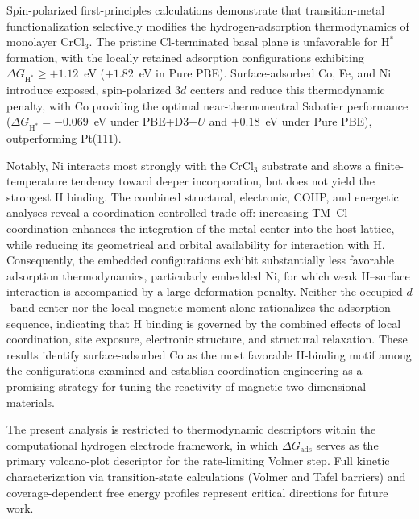 \documentclass[journal=jacsat,manuscript=article]{achemso}
\begin{document}
{\color{revcolor}%
  Spin-polarized first-principles calculations demonstrate that transition-metal functionalization selectively modifies the hydrogen-adsorption thermodynamics of monolayer CrCl$_3$. The pristine Cl-terminated basal plane is unfavorable for H$^*$ formation, with the locally retained adsorption configurations exhibiting $\Delta G_{\mathrm{H}^*} \ge +1.12$~eV ($+1.82$~eV in Pure PBE). Surface-adsorbed Co, Fe, and Ni introduce exposed, spin-polarized $3d$ centers and reduce this thermodynamic penalty, with Co providing the optimal near-thermoneutral Sabatier performance ($\Delta G_{\mathrm{H}^*}=-0.069$~eV under PBE+D3+$U$ and $+0.18$~eV under Pure PBE), outperforming Pt(111).

  Notably, Ni interacts most strongly with the CrCl$_3$ substrate and shows a finite-temperature tendency toward deeper incorporation, but does not yield the strongest H binding. The combined structural, electronic, COHP, and energetic analyses reveal a coordination-controlled trade-off: increasing TM--Cl coordination enhances the integration of the metal center into the host lattice, while reducing its geometrical and orbital availability for interaction with H. Consequently, the embedded configurations exhibit substantially less favorable adsorption thermodynamics, particularly embedded Ni, for which weak H--surface interaction is accompanied by a large deformation penalty. Neither the occupied $d$-band center nor the local magnetic moment alone rationalizes the adsorption sequence, indicating that H binding is governed by the combined effects of local coordination, site exposure, electronic structure, and structural relaxation. These results identify surface-adsorbed Co as the most favorable H-binding motif among the configurations examined and establish coordination engineering as a promising strategy for tuning the reactivity of magnetic two-dimensional materials.
\par}

{\color{revcolor}%
  The present analysis is restricted to thermodynamic descriptors within the computational hydrogen electrode framework, in which $\Delta G_{\mathrm{ads}}$ serves as the primary volcano-plot descriptor for the rate-limiting Volmer step. Full kinetic characterization via transition-state calculations (Volmer and Tafel barriers) and coverage-dependent free energy profiles represent critical directions for future work.
\par}
\end{document}
